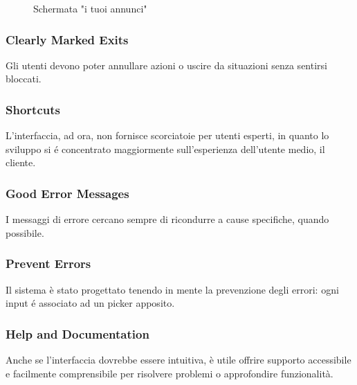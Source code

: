\begin{figure}[h]
  \caption{Schermata "i tuoi annunci"}
  \label{fig:Schermata "i tuoi annunci"}
\end{figure}

\subsubsection{Clearly Marked Exits}
Gli utenti devono poter annullare azioni o uscire da situazioni senza sentirsi bloccati.

\subsubsection{Shortcuts}
L'interfaccia, ad ora, non fornisce scorciatoie per utenti esperti, in quanto
lo sviluppo si é concentrato maggiormente sull'esperienza dell'utente medio, il cliente.

\subsubsection{Good Error Messages}
I messaggi di errore cercano sempre di ricondurre a cause specifiche, quando possibile.

\subsubsection{Prevent Errors}
Il sistema è stato progettato tenendo in mente la prevenzione degli errori: ogni
input é associato ad un picker apposito.

\subsubsection{Help and Documentation}
Anche se l'interfaccia dovrebbe essere intuitiva, è utile offrire supporto accessibile e facilmente comprensibile 
per risolvere problemi o approfondire funzionalità.

